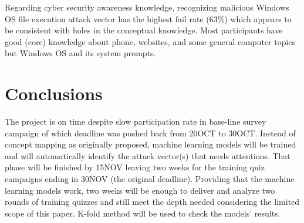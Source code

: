\documentclass[conference]{IEEEtran}
\begin{document}
Regarding cyber security awareness knowledge, recognizing malicious Windows OS file execution attack vector has the highest fail rate (63\%) which appears to be consistent with holes in the conceptual knowledge. Most participants have good (core) knowledge about phone, websites, and some general computer topics but Windows OS and its system prompts. 

\section{Conclusions}
The project is on time despite slow participation rate in base-line survey campaign of which deadline was pushed back from 20OCT to 30OCT. Instead of concept mapping as originally proposed, machine learning models will be trained and will automatically identify the attack vector(s) that needs attentions. That phase will be finished by 15NOV leaving two weeks for the training quiz campaigns ending in 30NOV (the original deadline). Providing that the machine learning models work, two weeks will be enough to deliver and analyze two rounds of training quizzes and still meet the depth needed considering the limited scope of this paper. K-fold method will be used to check the models' results. 

%
%

\end{document}
